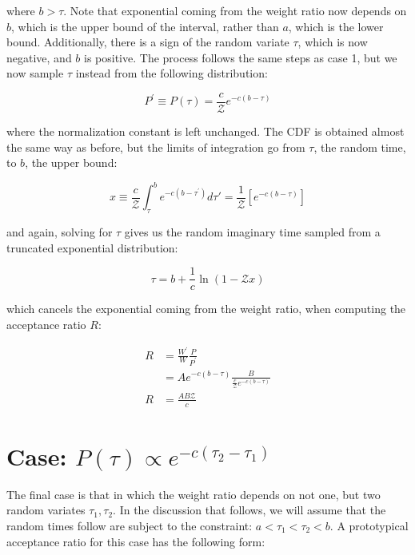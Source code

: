 \documentclass[12pt, two sided]{article}
\begin{document}
where $b>\tau$. Note that exponential coming from the weight ratio now depends on $b$, which is the upper bound of the interval, rather than $a$, which is the lower bound. Additionally, there is a sign of the random variate $\tau$, which is now negative, and $b$ is positive. The process follows the same steps as case 1, but we now sample $\tau$ instead from the following distribution:

\begin{equation}
P^\prime \equiv P(\tau) = \frac{c}{\mathcal{Z}}e^{-c(b-\tau)}
\end{equation}

where the normalization constant is left unchanged. The CDF is obtained almost the same way as before, but the limits of integration go from $\tau$, the random time, to $b$, the upper bound:

\begin{equation}
x \equiv \frac{c}{\mathcal{Z}} \int_{\tau}^{b} e^{-c(b-\tau^\prime)} d\tau\prime = \frac{1}{\mathcal{Z}}[e^{-c(b-\tau)}]
\end{equation}

and again, solving for $\tau$ gives us the random imaginary time sampled from a truncated exponential distribution:

\begin{equation}
\tau = b + \frac{1}{c} \ln(1-\mathcal{Z}x)
\end{equation}

which cancels the exponential coming from the weight ratio, when computing the acceptance ratio $R$:

\begin{align}
R &= \frac{W^\prime}{W} \frac{P}{P^\prime} \\
&= A e^{-c(b-\tau)} \frac{B}{\frac{c}{\mathcal{Z}}e^{-c(b-\tau)}} \\
R &= \frac{A B \mathcal{Z}}{c} 
\end{align}


\section{Case: $P(\tau) \propto e^{-c(\tau_2-\tau_1)}$}

The final case is that in which the weight ratio depends on not one, but two random variates $\tau_1,\tau_2$. In the discussion that follows, we will assume that the random times follow are subject to the constraint: $ a < \tau_1 < \tau_2 < b $. A prototypical acceptance ratio for this case has the following form:
\end{document}
